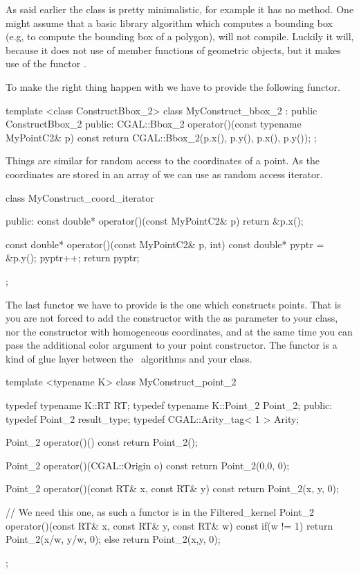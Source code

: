 As said earlier the class is pretty minimalistic, for
example it has no  method.  One
might assume that a basic library algorithm which computes 
a bounding box (e.g, to compute the bounding box of a polygon),
will not compile. Luckily it will, because it does not
use of member functions of geometric objects, but it makes
use of the functor .

To make the right thing happen with  we
have to provide the following functor.

\ccHtmlLinksOff
\begin{ccExampleCode}
template <class ConstructBbox_2>
class MyConstruct_bbox_2 : public ConstructBbox_2 {
public:
  CGAL::Bbox_2 operator()(const typename MyPointC2& p) const {
    return CGAL::Bbox_2(p.x(), p.y(), p.x(), p.y());
  }
};
\end{ccExampleCode}
\ccHtmlLinksOn


Things are similar for random access to the 
coordinates of a point. As the coordinates are stored
in an array of  we can use  as
random access iterator.

\ccHtmlLinksOff
\begin{ccExampleCode}
class MyConstruct_coord_iterator {
public:
  const double* operator()(const MyPointC2& p)
  {
    return &p.x();
  }

  const double* operator()(const MyPointC2& p, int)
  {
    const double* pyptr = &p.y();
    pyptr++;
    return pyptr;
  }
};
\end{ccExampleCode}
\ccHtmlLinksOn

The last functor we have to provide is the one which constructs
points. That is you are not forced to add the constructor 
with the  as parameter to your class, nor the constructor with 
homogeneous coordinates, and at the same time you can 
pass the additional color argument to your point constructor.
The functor is a kind of glue layer between the \cgal\ algorithms
and your class.

\ccHtmlLinksOff
\begin{ccExampleCode}
 template <typename K>
  class MyConstruct_point_2
  {
    typedef typename K::RT         RT;
    typedef typename K::Point_2    Point_2;
  public:
    typedef Point_2          result_type;
    typedef CGAL::Arity_tag< 1 >   Arity;

    Point_2
    operator()() const
    { return Point_2(); }

    Point_2
    operator()(CGAL::Origin o) const
    { return Point_2(0,0, 0); }

    Point_2
    operator()(const RT& x, const RT& y) const
    { return Point_2(x, y, 0); }

    
    // We need this one, as such a functor is in the Filtered_kernel
    Point_2
    operator()(const RT& x, const RT& y, const RT& w) const
    { 
      if(w != 1){
	return Point_2(x/w, y/w, 0); 
      } else {
	return Point_2(x,y, 0);
      }
    }
  };

\end{ccExampleCode}
\ccHtmlLinksOn


